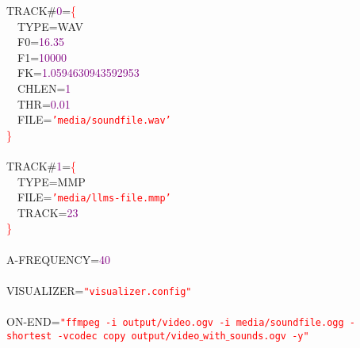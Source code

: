\noindent
\mbox{}TRACK\#\textcolor{Purple}{0}\textcolor{BrickRed}{=}\textcolor{Red}{\{} \\
\mbox{}\ \ TYPE\textcolor{BrickRed}{=}WAV \\
\mbox{}\ \ F0\textcolor{BrickRed}{=}\textcolor{Purple}{16.35} \\
\mbox{}\ \ F1\textcolor{BrickRed}{=}\textcolor{Purple}{10000} \\
\mbox{}\ \ FK\textcolor{BrickRed}{=}\textcolor{Purple}{1.0594630943592953} \\
\mbox{}\ \ CHLEN\textcolor{BrickRed}{=}\textcolor{Purple}{1} \\
\mbox{}\ \ THR\textcolor{BrickRed}{=}\textcolor{Purple}{0.01} \\
\mbox{}\ \ FILE\textcolor{BrickRed}{=}\texttt{\textcolor{Red}{'media/soundfile.wav'}} \\
\mbox{}\textcolor{Red}{\}} \\
\mbox{} \\
\mbox{}TRACK\#\textcolor{Purple}{1}\textcolor{BrickRed}{=}\textcolor{Red}{\{} \\
\mbox{}\ \ TYPE\textcolor{BrickRed}{=}MMP \\
\mbox{}\ \ FILE\textcolor{BrickRed}{=}\texttt{\textcolor{Red}{'media/llms-file.mmp'}} \\
\mbox{}\ \ TRACK\textcolor{BrickRed}{=}\textcolor{Purple}{23} \\
\mbox{}\textcolor{Red}{\}} \\
\mbox{} \\
\mbox{}A\textcolor{BrickRed}{-}FREQUENCY\textcolor{BrickRed}{=}\textcolor{Purple}{40} \\
\mbox{} \\
\mbox{}VISUALIZER\textcolor{BrickRed}{=}\texttt{\textcolor{Red}{"{}visualizer.config"{}}} \\
\mbox{} \\
\mbox{}ON\textcolor{BrickRed}{-}END\textcolor{BrickRed}{=}\texttt{\textcolor{Red}{"{}ffmpeg\ -i\ output/video.ogv\ -i\ media/soundfile.ogg\ -shortest\ -vcodec\ copy\ output/video$\_$with$\_$sounds.ogv\ -y"{}}}
